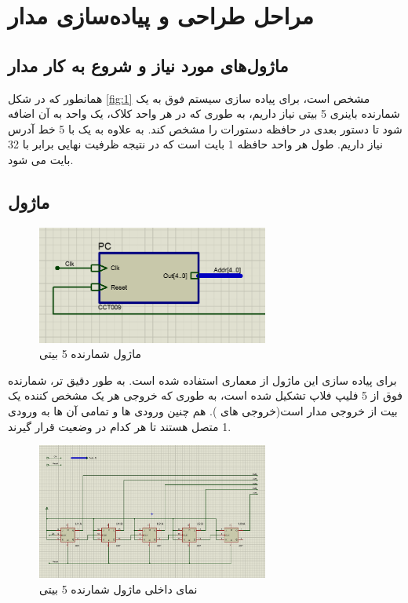\documentclass[12pt,onecolumn,a4paper,fleqn]{article}
\begin{document}
	\section{مراحل طراحی و پیاده‌سازی مدار}
	\subsection*{ماژول‌های مورد نیاز و شروع به کار مدار}
		همانطور که در شکل \ref{fig:1}  مشخص است، برای پیاده سازی سیستم فوق به یک شمارنده باینری 5 بیتی نیاز داریم، به طوری که در هر واحد کلاک، یک واحد به آن اضافه شود تا دستور بعدی در حافظه دستورات را مشخص کند. به علاوه به یک  با 5 خط آدرس نیاز داریم. طول هر واحد حافظه  1 بایت است که در نتیجه ظرفیت نهایی برابر با 32 بایت می شود. 
	\subsection{ماژول }
		\begin{figure}[H]
					\centering
					\includegraphics[width=0.68\textwidth]{source/3.png}
					\caption{ماژول شمارنده 5 بیتی}
					\label{fig:3}
	\end{figure}		برای پیاده سازی این ماژول از معماری  استفاده شده است. به طور دقیق تر، شمارنده فوق از 5 فلیپ فلاپ  تشکیل شده است، به طوری که خروجی  هر یک مشخص کننده یک بیت از خروجی مدار است(خروجی های ). هم چنین ورودی ها  و  تمامی آن ها به ورودی 1 متصل هستند تا هر کدام در وضعیت  قرار گیرند. 
	\begin{figure}[H]
						\centering
						\includegraphics[width=0.68\textwidth]{source/4.png}
						\caption{نمای داخلی ماژول شمارنده 5 بیتی}
						\label{fig:4}
	\end{figure}
	
\end{document}
